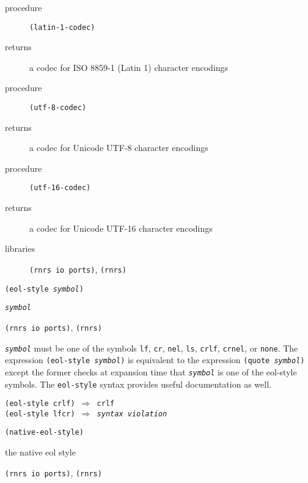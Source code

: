 \begin{description}

\label{io_s22}\item[procedure] \texttt{(latin-1-codec)}



\item[returns] a codec for ISO 8859-1 (Latin 1) character encodings


\item[procedure] \texttt{(utf-8-codec)}



\item[returns] a codec for Unicode UTF-8 character encodings


\item[procedure] \texttt{(utf-16-codec)}



\item[returns] a codec for Unicode UTF-16 character encodings


\item[libraries] \texttt{(rnrs io ports)}, \texttt{(rnrs)}
\end{description}

\begin{description}

\label{io_s23}\item[syntax] \texttt{(eol-style \textit{symbol})}



\item[returns] \texttt{\textit{symbol}}


\item[libraries] \texttt{(rnrs io ports)}, \texttt{(rnrs)}
\end{description}

\texttt{\textit{symbol}} must be one of the symbols \texttt{lf}, \texttt{cr}, \texttt{nel},
\texttt{ls}, \texttt{crlf}, \texttt{crnel}, or \texttt{none}.
The expression \texttt{(eol-style \textit{symbol})} is equivalent to the
expression \texttt{(quote \textit{symbol})} except the former checks at
expansion time that \texttt{\textit{symbol}} is one of the eol-style symbols.
The \texttt{eol-style} syntax provides useful documentation as well.

\begin{alltt}
(eol-style crlf) \(\Rightarrow\) crlf
(eol-style lfcr) \(\Rightarrow\) \textit{syntax violation}
\end{alltt}

\begin{description}

\label{io_s24}\item[procedure] \texttt{(native-eol-style)}



\item[returns] the native eol style


\item[libraries] \texttt{(rnrs io ports)}, \texttt{(rnrs)}
\end{description}


